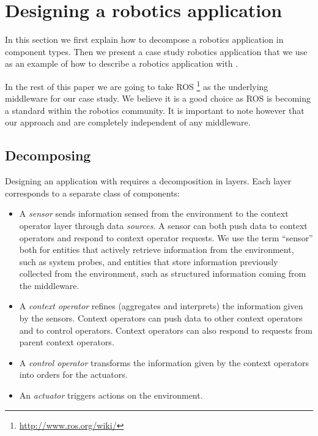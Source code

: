 \section{Designing a robotics application}
\label{sec:designing}

In this section we first explain how to decompose a robotics
application in \diaspec{} component types. Then we present a case
study robotics application that we use as an example of how to
describe a robotics application with \diaspec{}.

In the rest of this paper we are going to take ROS
\footnote{\url{http://www.ros.org/wiki/}} as the underlying middleware
for our case study. We believe it is a good choice as ROS is becoming
a standard within the robotics community. It is important to note
however that our approach and \diaspec{} are completely independent of
any middleware.

\subsection{Decomposing}

Designing an application with \diaspec{} requires a decomposition in
layers. Each layer corresponds to a separate class of components:

\begin{itemize}
\item A \emph{sensor} sends information sensed from the environment to
  the context operator layer through data \emph{sources}. A sensor can
  both push data to context operators and respond to context operator
  requests. We use the term ``sensor'' both for entities that actively
  retrieve information from the environment, such as system probes,
  and entities that store information previously collected from the
  environment, such as structured information coming from the
  middleware.
\item A \emph{context operator} refines (aggregates and interprets)
  the information given by the sensors. Context operators can push
  data to other context operators and to control operators. Context
  operators can also respond to requests from parent context
  operators.
\item A \emph{control operator} transforms the information given by
  the context operators into orders for the actuators.
\item An \emph{actuator} triggers actions on the environment.
\end{itemize}

